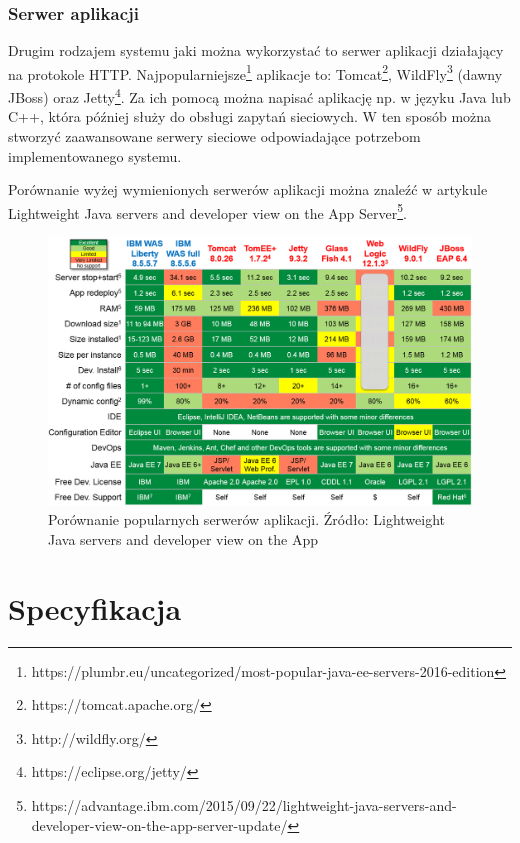 \documentclass{report}
\begin{document}
			\subsection{Serwer aplikacji}
			Drugim rodzajem systemu jaki można wykorzystać to serwer aplikacji działający na protokole HTTP. Najpopularniejsze\footnote{https://plumbr.eu/uncategorized/most-popular-java-ee-servers-2016-edition} aplikacje to: Tomcat\footnote{https://tomcat.apache.org/}, WildFly\footnote{http://wildfly.org/} (dawny JBoss) oraz Jetty\footnote{https://eclipse.org/jetty/}. Za ich pomocą można napisać aplikację np. w języku Java lub C++, która później służy do obsługi zapytań sieciowych. W ten sposób można stworzyć zaawansowane serwery sieciowe odpowiadające potrzebom implementowanego systemu.
		
			Porównanie wyżej wymienionych serwerów aplikacji można znaleźć w artykule Lightweight Java servers and developer view on the App Server\footnote{https://advantage.ibm.com/2015/09/22/lightweight-java-servers-and-developer-view-on-the-app-server-update/}.
		
			\begin{center}
				\begin{figure}[ht]
					\centering
					\includegraphics[scale=0.55]{weblogic-jboss-wildfly-websphere-liberty-tomee-tomcat-glassfish-comparison1.png}
					\caption{Porównanie popularnych serwerów aplikacji. Źródło: Lightweight Java servers and developer view on the App}
				\end{figure}
			\end{center}
	
	\chapter{Specyfikacja}
	
\end{document}
